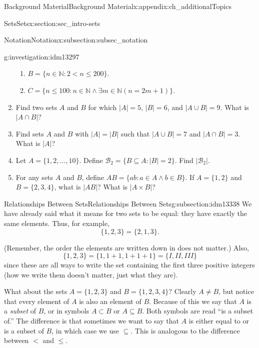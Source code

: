 \documentclass[oneside,10pt,]{book}
\numberwithin{equation}{chapter}
\def\N{\mathbb N}
\def\st{:}
\newcommand{\lt}{<}
\begin{document}
\begin{appendixptx}{Background Material}{}{Background Material}{}{}{x:appendix:ch_additionalTopics}
\begin{sectionptx}{Sets}{}{Sets}{}{}{x:section:sec_intro-sets}
\begin{subsectionptx}{Notation}{}{Notation}{}{}{x:subsection:subsec_notation}
\begin{investigation}{}{g:investigation:idm13297}
\begin{enumerate}
\begin{enumerate}
\item{}\(B = \{n \in \N \st 2 \lt  n \le 200\}\).%
\item{}\(C = \{n \le 100 \st n \in \N \wedge \exists m \in \N (n = 2m+1)\}\).%
\end{enumerate}
%
\item{}Find two sets \(A\) and \(B\) for which \(|A| = 5\), \(|B| = 6\), and \(|A\cup B| = 9\). What is \(|A \cap B|\)?%
\item{}Find sets \(A\) and \(B\) with \(|A| = |B|\) such that \(|A\cup B| = 7\) and \(|A \cap B| = 3\). What is \(|A|\)?%
\item{}Let \(A = \{1,2,\ldots, 10\}\). Define \(\mathcal{B}_2 = \{B \subseteq A \st |B| = 2\}\). Find \(|\mathcal{B}_2|\).%
\item{}For any sets \(A\) and \(B\), define \(AB = \{ab \st a\in A \wedge b \in B\}\). If \(A = \{1,2\}\) and \(B = \{2,3,4\}\), what is \(|AB|\)? What is \(|A \times B|\)?%
\end{enumerate}
%
\end{investigation}
\end{subsectionptx}
%
%
\typeout{************************************************}
\typeout{************************************************}
%
\begin{subsectionptx}{Relationships Between Sets}{}{Relationships Between Sets}{}{}{g:subsection:idm13338}
We have already said what it means for two sets to be equal: they have exactly the same elements. Thus, for example,%
\begin{equation*}
\{1, 2, 3\} = \{2, 1, 3\}.
\end{equation*}
%
\par
(Remember, the order the elements are written down in does not matter.) Also,%
\begin{equation*}
\{1, 2, 3\} = \{1, 1+1, 1+1+1\} = \{I, II, III\}
\end{equation*}
since these are all ways to write the set containing the first three positive integers (how we write them doesn't matter, just what they are).%
\par
What about the sets \(A = \{1, 2, 3\}\) and \(B = \{1, 2, 3, 4\}\)? Clearly \(A \ne B\), but notice that every element of \(A\) is also an element of \(B\). Because of this we say that \(A\) is a \emph{subset}  of \(B\), or in symbols \(A \subset B\) or \(A \subseteq B\). Both symbols are read ``is a subset of.'' The difference is that sometimes we want to say that \(A\) is either equal to or is a subset of \(B\), in which case we use \(\subseteq\). This is analogous to the difference between \(\lt\) and \(\le\).%

\end{subsectionptx}
\end{sectionptx}
\end{appendixptx}
\end{document}
